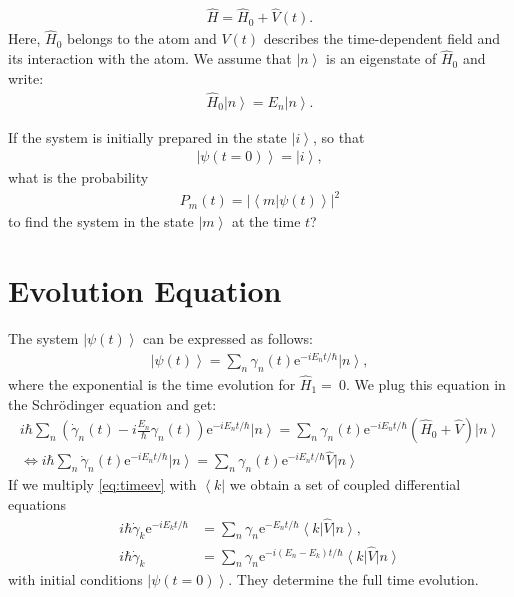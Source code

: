 \documentclass[10pt]{article}
\newcommand{\bra}[1]{\ensuremath{\left\langle#1\right|}}
\newcommand{\ket}[1]{\ensuremath{\left|#1\right\rangle}}
\newcommand{\braket}[1]{\ensuremath{\left\langle#1\right\rangle}}
\newcommand{\eexp}[1]{\mathrm{e}^{#1}}
\begin{document}
\begin{align}
 \hat{H} = \hat{H}_0 + \hat{V}(t).
\end{align}
Here, $\hat{H}_0$ belongs to the atom and $V(t)$ describes the time-dependent field and its interaction with the atom. We assume that $\ket{n}$ is an eigenstate of $\hat{H}_0$ and write:
\begin{align}
\hat{H}_0\ket{n} = E_n \ket{n}.
\end{align}

If the system is initially prepared in the state $\ket{i}$, so that
\begin{align}
\ket{\psi(t=0)} = \ket{i},
\end{align}
what is the probability
\begin{align}
P_m(t) = \left|\braket{m|\psi(t)}\right|^2
\end{align}
to find the system in the state $\ket{m}$ at the time $t$?

\section{Evolution Equation}
The system $\ket{\psi(t)}$ can be expressed as follows:
\begin{align}
\ket{\psi(t)} = \sum_n \gamma_n(t) \eexp{-i{E_n}t/{\hbar}} \ket{n},
\end{align}
where the exponential is the time evolution for $\hat{H}_1 =~0$. We plug this equation in the Schrödinger equation and get:
\begin{align}
i\hbar \sum_n\left(\dot{\gamma}_n(t)-i\frac{E_n}{\hbar}\gamma_n(t)\right)\eexp{-i{E_n}t/{\hbar}}\ket{n} = \sum_n \gamma_n(t) \eexp{-i{E_n}t/{\hbar}}\left(\hat{H}_0 + \hat{V}\right) \ket{n}\label{eq:timeev}\\
\Longleftrightarrow i\hbar\sum_n \dot{\gamma}_n(t) \eexp{-i{E_n}t/{\hbar}} \ket{n}
 = \sum_n \gamma_n(t) \eexp{-i{E_n}t/{\hbar}} \hat{V} \ket{n}
\end{align}
If we multiply \eqref{eq:timeev} with $\bra{k}$ we obtain a set of coupled differential equations
\begin{align}
i\hbar \dot{\gamma}_k \eexp{-i{E_k}t/{\hbar}} &= \sum_n \gamma_n \eexp{-{E_n}t/{\hbar}}\bra{k}\hat{V}\ket{n},\\
i\hbar \dot{\gamma}_k &= \sum_n \gamma_n \eexp{-i {(E_n-E_k)}t/{\hbar}} \bra{k} \hat{V}\ket{n}
\end{align}
with initial conditions $\ket{\psi(t=0)}$. They determine the full time evolution. 
\end{document}
